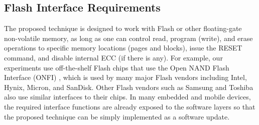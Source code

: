 \subsection{Flash Interface Requirements}

The proposed technique is designed to work with Flash or other floating-gate 
non-volatile memory, as long as one can control read, program (write), and erase 
operations to specific memory locations (pages and blocks), issue the RESET 
command, and disable internal ECC (if there is any). 
For example, our experiments use off-the-shelf Flash chips that
use the Open NAND Flash Interface (ONFI) \cite{onfi}, which is used by 
many major Flash vendors including Intel, Hynix, Micron, and SanDisk. Other 
Flash vendors such as Samsung and Toshiba also use similar interfaces to their chips. 
In many embedded and mobile devices, the required interface functions are already
exposed to the software layers so that the proposed technique can be simply implemented
as a software update.


